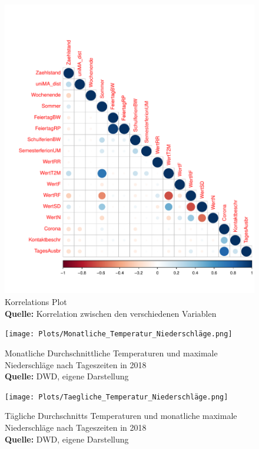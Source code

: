 \documentclass[a4paper,12pt]{thesis}
\newcommand*{\captionsource}[2]{%
	\caption[{#1}]{%
		#1%
		\\\hspace{\linewidth}%
		\textbf{Quelle:} #2%
	}%
}
\begin{document}
\begin{figure}[!ht]
	\centering
	\includegraphics[width=\textwidth]{Plots/Corr_Plot.pdf}
	\captionsource{Korrelations Plot}{
		Korrelation zwischen den verschiedenen Variablen
	}
	\label{fig:meine-grafik5}
\end{figure}

\begin{figure}[!ht]
	\centering
	\texttt{[image: Plots/Monatliche\_Temperatur\_Niederschläge.png]}
	\captionsource{Monatliche Durchschnittliche Temperaturen und maximale Niederschläge nach Tageszeiten in 2018}{
		DWD, eigene Darstellung
	}
	\label{fig:meine-grafik5}
\end{figure}

\begin{figure}[!ht]
	\centering
	\texttt{[image: Plots/Taegliche\_Temperatur\_Niederschläge.png]}
	\captionsource{Tägliche Durchschnitts Temperaturen und monatliche maximale Niederschläge nach Tageszeiten in 2018}{
		DWD, eigene Darstellung
	}
	\label{fig:meine-grafik5}
\end{figure}
\end{document}
